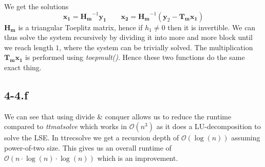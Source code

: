 \documentclass{article}
\begin{document}
We get the solutions
\begin{equation*}
    \mathbf{x_{1}} = \mathbf{H_{m}}^{-1}\mathbf{y_{1}} \qquad \mathbf{x_{2}} = \mathbf{H_{m}}^{-1}\left(\mathbf{y}_{2} - \mathbf{T_{m}x_{1}}\right)
\end{equation*}
$\mathbf{H_{m}}$ is a triangular Toeplitz matrix, hence if $h_{1} \neq 0$ then it is invertible. We can thus solve the system recursively by dividing it into more and more block until we reach length $1$, where the system can be trivially solved. The multiplication $\mathbf{T_{m}x_{1}}$ is performed using \textit{toepmult()}. Hence these two functions do the same exact thing.
\subsection*{4-4.f}
We can see that using divide \& conquer allows us to reduce the runtime compared to \textit{ttmatsolve} which works in $\mathcal{O}\left(n^{3}\right)$ as it does a LU-decomposition to solve the LSE. In ttrecsolve we get a recursion depth of $\mathcal{O}\left(\log\left(n\right)\right)$ assuming power-of-two size. This gives us an overall runtime of $\mathcal{O}\left(n \cdot \log\left(n\right)\cdot \log\left(n\right)\right)$ which is an improvement.
\end{document}
